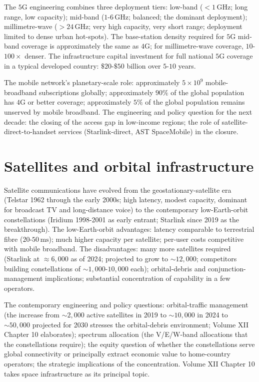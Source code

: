 The $5$G engineering combines three deployment tiers: low-band ($<1\,\text{GHz}$; long range, low capacity); mid-band ($1$-$6\,\text{GHz}$; balanced; the dominant deployment); millimetre-wave ($>24\,\text{GHz}$; very high capacity, very short range; deployment limited to dense urban hot-spots). The base-station density required for $5$G mid-band coverage is approximately the same as $4$G; for millimetre-wave coverage, $10$-$100\times$ denser. The infrastructure capital investment for full national $5$G coverage in a typical developed country: $\$20$-$\$50$ billion over $5$-$10$ years.

The mobile network's planetary-scale role: approximately $5 \times 10^9$ mobile-broadband subscriptions globally; approximately $90\%$ of the global population has $4$G or better coverage; approximately $5\%$ of the global population remains unserved by mobile broadband. The engineering and policy question for the next decade: the closing of the access gap in low-income regions; the role of satellite-direct-to-handset services (Starlink-direct, AST SpaceMobile) in the closure.

\section{Satellites and orbital infrastructure}

Satellite communications have evolved from the geostationary-satellite era (Telstar 1962 through the early 2000s; high latency, modest capacity, dominant for broadcast TV and long-distance voice) to the contemporary low-Earth-orbit constellations (Iridium 1998-2001 as early entrant; Starlink since 2019 as the breakthrough). The low-Earth-orbit advantages: latency comparable to terrestrial fibre ($20$-$50\,\text{ms}$); much higher capacity per satellite; per-user costs competitive with mobile broadband. The disadvantages: many more satellites required (Starlink at $\approx 6{,}000$ as of 2024; projected to grow to $\sim 12{,}000$; competitors building constellations of $\sim 1{,}000$-$10{,}000$ each); orbital-debris and conjunction-management implications; substantial concentration of capability in a few operators.

The contemporary engineering and policy questions: orbital-traffic management (the increase from $\sim 2{,}000$ active satellites in 2019 to $\sim 10{,}000$ in 2024 to $\sim 50{,}000$ projected for 2030 stresses the orbital-debris environment; Volume XII Chapter 10 elaborates); spectrum allocation (the V/E/W-band allocations that the constellations require); the equity question of whether the constellations serve global connectivity or principally extract economic value to home-country operators; the strategic implications of the concentration. Volume XII Chapter 10 takes space infrastructure as its principal topic.

